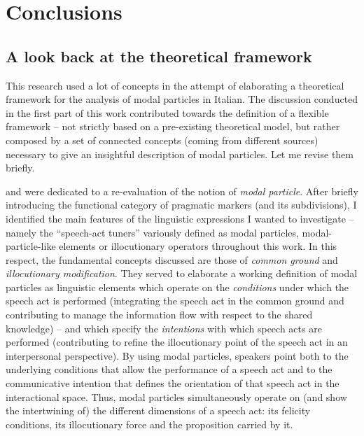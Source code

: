 \chapter{Conclusions}\label{sec:10}
\hypertarget{Toc124860693}{}\section{A look back at the theoretical framework}
\hypertarget{Toc124860694}{}
This research used a lot of concepts in the attempt of elaborating a theoretical framework for the analysis of modal particles in Italian. The discussion conducted in the first part of this work contributed towards the definition of a flexible framework – not strictly based on a pre-existing theoretical model, but rather composed by a set of connected concepts (coming from different sources) necessary to give an insightful description of modal particles. Let me revise them briefly.

 and  were dedicated to a re-evaluation of the notion of \textit{modal particle}. After briefly introducing the functional category of pragmatic markers (and its subdivisions), I identified the main features of the linguistic expressions I wanted to investigate – namely the “speech-act tuners” variously defined as modal particles, modal-particle-like elements or illocutionary operators throughout this work. In this respect, the fundamental concepts discussed are those of \textit{common ground} and \textit{illocutionary modification}. They served to elaborate a working definition of modal particles as linguistic elements which operate on the \textit{conditions} under which the speech act is performed (integrating the speech act in the common ground and contributing to manage the information flow with respect to the shared knowledge) – and which specify the \textit{intentions} with which speech acts are performed (contributing to refine the illocutionary point of the speech act in an interpersonal perspective). By using modal particles, speakers point both to the underlying conditions that allow the performance of a speech act and to the communicative intention that defines the orientation of that speech act in the interactional space. Thus, modal particles simultaneously operate on (and show the intertwining of) the different dimensions of a speech act: its felicity conditions, its illocutionary force and the proposition carried by it.

